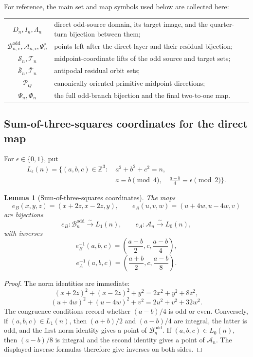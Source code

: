 \documentclass[11pt]{amsart}
\newtheorem{lemma}[theorem]{Lemma}
\theoremstyle{definition}
\theoremstyle{remark}
\newcommand{\Z}{\mathbb Z}
\newcommand{\An}{\mathcal A_n}
\newcommand{\Bodd}{\mathcal B_n^{\mathrm{odd}}}
\newcommand{\Boddres}{\mathcal B_{n,\circ}^{\mathrm{odd}}}
\newcommand{\Ares}{\mathcal A_{n,\circ}}
\newcommand{\Sn}{\mathcal S_n}
\newcommand{\Tn}{\mathcal T_n}
\newcommand{\Sbar}{\overline{\mathcal S}_n}
\newcommand{\Tbar}{\overline{\mathcal T}_n}
\newcommand{\Dcal}{\mathcal P_Q}
\begin{document}
For reference, the main set and map symbols used below are collected here:
\begin{center}
\renewcommand{\arraystretch}{1.12}
\begin{tabular}{@{}c p{}@{}}
$D_n,I_n,\Lambda_n$&direct odd-source domain, its target image, and the
quarter-turn bijection between them;\\
$\Boddres,\Ares,\Psi_n^\circ$&points left after the direct layer and their
residual bijection;\\
$\Sn,\Tn$&midpoint-coordinate lifts of the odd source and target sets;\\
$\Sbar,\Tbar$&antipodal residual orbit sets;\\
$\Dcal$&canonically oriented primitive midpoint directions;\\
$\Psi_n,\Phi_n$&the full odd-branch bijection and the final two-to-one map.
\end{tabular}
\end{center}

\subsection{Sum-of-three-squares coordinates for the direct map}
For $\epsilon\in\{0,1\}$, put
\[
 \begin{aligned}
 L_\epsilon(n)=\{(a,b,c)\in\Z^3:
 &\ a^2+b^2+c^2=n,\\
 &\ a\equiv b\pmod4,\quad
 \frac{a-b}{4}\equiv\epsilon\pmod2\}.
 \end{aligned}
\]

\begin{lemma}[Sum-of-three-squares coordinates]\label{lem:pure-coordinates}
The maps
\[
 e_B(x,y,z)=(x+2z,x-2z,y),
 \qquad
 e_A(u,v,w)=(u+4w,u-4w,v)
\]
are bijections
\[
 e_B:\Bodd\xrightarrow{\sim}L_1(n),
 \qquad
 e_A:\An\xrightarrow{\sim}L_0(n),
\]
with inverses
\[
 e_B^{-1}(a,b,c)=\left(\frac{a+b}{2},c,\frac{a-b}{4}\right),
\]
\[
 e_A^{-1}(a,b,c)=\left(\frac{a+b}{2},c,\frac{a-b}{8}\right).
\]
\end{lemma}

\begin{proof}
The norm identities are immediate:
\[
 (x+2z)^2+(x-2z)^2+y^2=2x^2+y^2+8z^2,
\]
\[
 (u+4w)^2+(u-4w)^2+v^2=2u^2+v^2+32w^2.
\]
The congruence conditions record whether $(a-b)/4$ is odd or even.
Conversely, if $(a,b,c)\in L_1(n)$, then $(a+b)/2$ and $(a-b)/4$ are
integral, the latter is odd, and the first norm identity gives a point of
$\Bodd$.  If $(a,b,c)\in L_0(n)$, then $(a-b)/8$ is integral and the second
identity gives a point of $\An$.  The displayed inverse formulas therefore
give inverses on both sides.
\end{proof}
\end{document}
